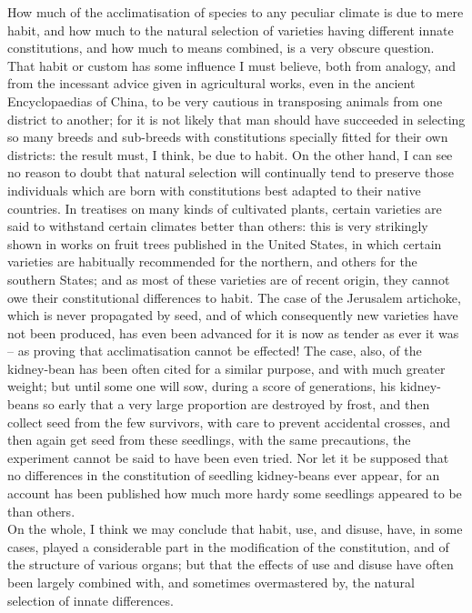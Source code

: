 \indent How much of the acclimatisation of species to any peculiar climate is due to mere habit, and how much to the natural selection of varieties having different innate constitutions, and how much to means combined, is a very obscure question. That habit or custom has some influence I must believe, both from analogy, and from the incessant advice given in agricultural works, even in the ancient Encyclopaedias of China, to be very cautious in transposing animals from one district to another; for it is not likely that man should have succeeded in selecting so many breeds and sub-breeds with constitutions specially fitted for their own districts: the result must, I think, be due to habit. On the other hand, I can see no reason to doubt that natural selection will continually tend to preserve those individuals which are born with constitutions best adapted to their native countries. In treatises on many kinds of cultivated plants, certain varieties are said to withstand certain climates better than others: this is very strikingly shown in works on fruit trees published in the United States, in which certain varieties are habitually recommended for the northern, and others for the southern States; and as most of these varieties are of recent origin, they cannot owe their constitutional differences to habit. The case of the Jerusalem artichoke, which is never propagated by seed, and of which consequently new varieties have not been produced, has even been advanced for it is now as tender as ever it was -- as proving that acclimatisation cannot be effected! The case, also, of the kidney-bean has been often cited for a similar purpose, and with much greater weight; but until some one will sow, during a score of generations, his kidney-beans so early that a very large proportion are destroyed by frost, and then collect seed from the few survivors, with care to prevent accidental crosses, and then again get seed from these seedlings, with the same precautions, the experiment cannot be said to have been even tried. Nor let it be supposed that no differences in the constitution of seedling kidney-beans ever appear, for an account has been published how much more hardy some seedlings appeared to be than others.\\
\indent On the whole, I think we may conclude that habit, use, and disuse, have, in some cases, played a considerable part in the modification of the constitution, and of the structure of various organs; but that the effects of use and disuse have often been largely combined with, and sometimes overmastered by, the natural selection of innate differences.\\

